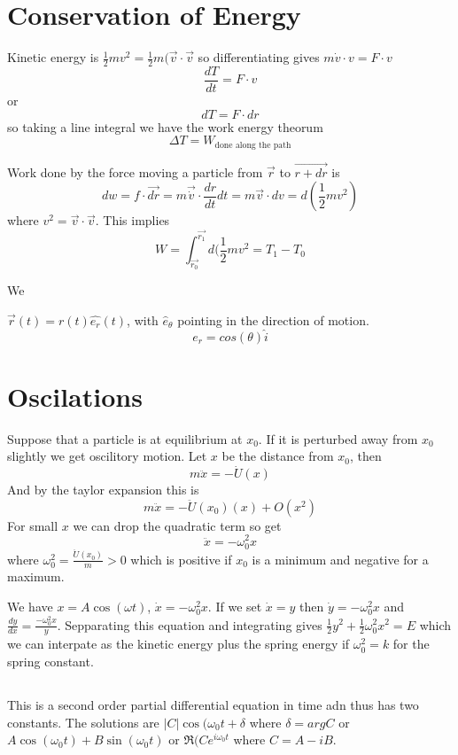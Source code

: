 \documentclass{homework}
\begin{document}
\section{Conservation of Energy}

Kinetic energy is $\frac{1}{2}mv^2 = \frac{1}{2}m(\vec{v} \cdot \vec{v}$ so differentiating gives $m\dot{v} \cdot v = F \cdot v$ 
\[\frac{dT}{dt} = F \cdot v \]
or
\[dT = F \cdot dr\]
so taking a line integral we have the work energy theorum
\[\Delta T = W_{\text{done along the path}}\]

Work done by the force moving a particle from $\vec{r}$ to $\vec{r + dr}$ is 
\[dw = f\cdot \vec{dr} = m\vec{\dot{v}} \cdot \frac{dr}{dt}dt = m\vec{v} \cdot dv = d(\frac{1}{2}mv^2) \]
where $v^2 = \vec{v} \cdot \vec{v}$. This implies 
\[W = \int_{\vec{r_0}}^{\vec{r_1}}d(\frac{1}{2}mv^2 = T_1 - T_0 \]





We 





$\vec{r}(t) = r(t)\hat{e_r}(t)$, with $\hat e_{\theta}$ pointing in the direction of motion.
\[e_r = cos(\theta)\hat i\]





\section{Oscilations}

Suppose that a particle is at equilibrium at $x_0$. If it is perturbed away from $x_0$ slightly we get oscilitory motion. Let $x$ be the distance from $x_0$, then
\[m\ddot x = -\dot U (x)\]
And by the taylor expansion this is
\[m\ddot x = -\ddot U(x_0)(x) + O(x^2)\]
For small $x$ we can drop the quadratic term so get
\[\ddot x = -\omega_0^2 x\]
where $\omega_0^2 = \frac{\ddot U(x_0)}{m} > 0$ which is positive if $x_0$ is a minimum and negative for a maximum. 

We have $x = A \cos (\omega t)$, $\dot x = -\omega_0^2 x$. If we set $\dot x = y$ then $\dot y = -\omega_0^2 x$ and $\frac{dy}{dx} = \frac{-\omega_0^2 x}{y}$. Sepparating this equation and integrating gives $\frac{1}{2}y^2 + \frac{1}{2}\omega_0^2x^2 = E$ which we can interpate as the kinetic energy plus the spring energy if $\omega_0^2 = k$ for the spring constant. 

\subsection{}
This is a second order partial differential equation in time adn thus has two constants. The solutions are
$|C|\cos(\omega_0 t + \delta$ where $\delta = arg C$ or $A \cos (\omega_0 t) + B \sin (\omega_0 t)$ or $\Re (Ce^{i\omega_0 t}$ where $C = A - iB$.
\end{document}
